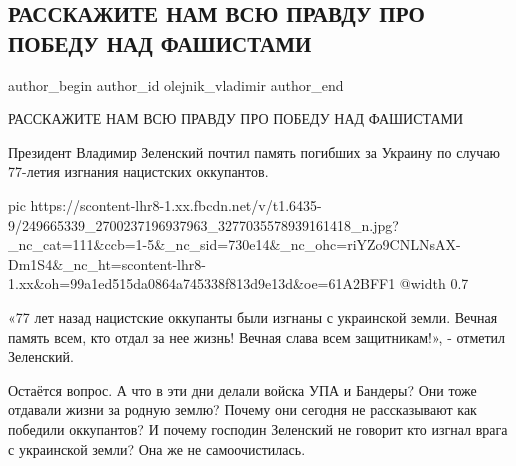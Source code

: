  
 
 
 
 
 
\subsection{РАССКАЖИТЕ НАМ ВСЮ ПРАВДУ ПРО ПОБЕДУ НАД ФАШИСТАМИ}
\label{sec:28_10_2021.fb.olejnik_vladimir.1.pobeda_fashizm}
 
\ifcmt
 author_begin
   author_id olejnik_vladimir
 author_end
\fi

РАССКАЖИТЕ НАМ ВСЮ ПРАВДУ ПРО ПОБЕДУ НАД ФАШИСТАМИ

Президент Владимир Зеленский почтил память погибших за Украину по случаю
77-летия изгнания нацистских оккупантов.

\ifcmt
  pic https://scontent-lhr8-1.xx.fbcdn.net/v/t1.6435-9/249665339_2700237196937963_3277035578939161418_n.jpg?_nc_cat=111&ccb=1-5&_nc_sid=730e14&_nc_ohc=riYZo9CNLNsAX-Dm1S4&_nc_ht=scontent-lhr8-1.xx&oh=99a1ed515da0864a745338f813d9e13d&oe=61A2BFF1
  @width 0.7
\fi

«77 лет назад нацистские оккупанты были изгнаны с украинской земли. Вечная
память всем, кто отдал за нее жизнь! Вечная слава всем защитникам!», - отметил
Зеленский. 

Остаётся вопрос. А что в эти дни делали войска УПА и Бандеры? Они тоже отдавали
жизни за родную землю? Почему они сегодня не рассказывают как победили
оккупантов? И почему господин Зеленский не говорит кто изгнал врага с
украинской земли? Она же не самоочистилась.
